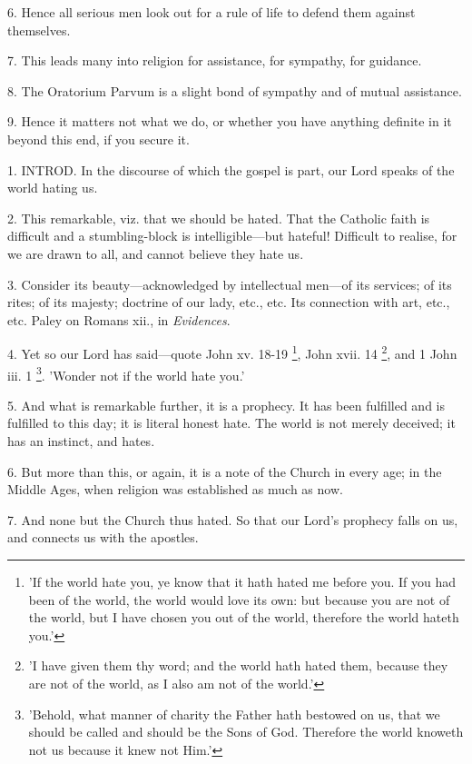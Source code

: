 6. Hence all serious men look out for a rule of
life to defend them against themselves.

7. This leads many into religion for assistance,
for sympathy, for guidance.

8. The Oratorium Parvum is a slight bond of
sympathy and of mutual assistance.

9. Hence it matters not what we do, or whether
you have anything definite in it beyond this end, if you secure it.


1. INTROD.
In the discourse of which the gospel is part, our Lord speaks of the
world hating us.

2. This remarkable, viz. that we should be hated.
That the Catholic faith is difficult and a stumbling-block is
intelligible—but hateful! Difficult to realise, for we are drawn to
all, and cannot believe they hate us.

3. Consider its beauty—acknowledged by
intellectual men—of its services; of its rites; of its majesty;
doctrine of our lady, etc., etc. Its connection with art, etc., etc.
Paley on Romans xii., in \emph{Evidences}.

4. Yet so our Lord has said—quote John xv.
18-19 \footnote{'If the world hate you, ye
know that it hath hated me before you. If you had been of the world,
the world would love its own: but because you are not of the world,
but I have chosen you out of the world, therefore the world hateth
you.'}, John xvii. 14
\footnote{'I have given them thy
word; and the world hath hated them, because they are not of the
world, as I also am not of the world.'}, and 1 John iii. 1 \footnote{'Behold, what manner of
charity the Father hath bestowed on us, that we should be called and
should be the Sons of God. Therefore the world knoweth not us because
it knew not Him.'}. 'Wonder not if the world hate you.'

5. And what is remarkable further, it is a
prophecy. It has been fulfilled and is fulfilled to this day; it is
literal honest hate. The world is not merely deceived; it has an
instinct, and hates.

6. But more than this, or again, it is a note of
the Church in every age; in the Middle Ages, when religion was
established as much as now.

7. And none but the Church thus hated. So that
our Lord's prophecy falls on us, and connects us with the apostles.

